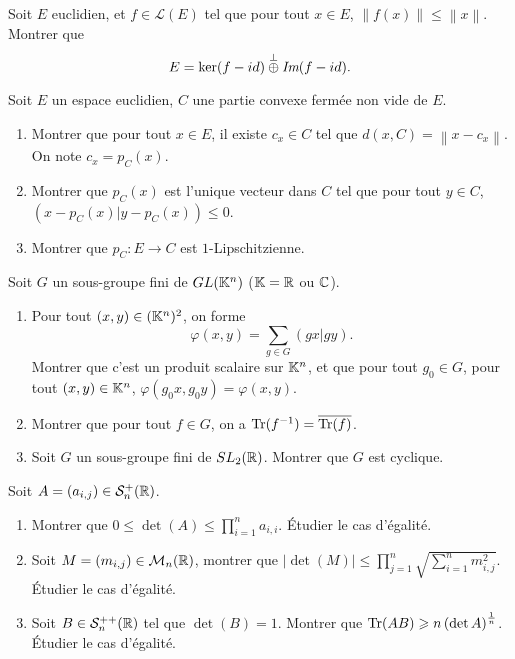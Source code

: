 \documentclass[12pt]{article}
\begin{document}
\begin{exercise}
	Soit $E$ euclidien, et $f\in\mathcal{L}(E)$ tel que pour tout $x\in E$, $\left\lVert f(x)\right\rVert\leqslant\left\lVert x\right\rVert$. Montrer que 
	\begin{equation}
		E=\ker(f-id)\overset{\perp}{\oplus}\emph{Im}(f-id).
	\end{equation}
\end{exercise}

\begin{exercise}
	Soit $E$ un espace euclidien, $C$ une partie convexe fermée non vide de $E$.
	\begin{enumerate}
		\item Montrer que pour tout $x\in E$, il existe $c_x\in C$ tel que $d(x,C)=\left\lVert x-c_x\right\rVert$. On note $c_x=p_{C}(x)$.
		\item Montrer que $p_{C}(x)$ est l'unique vecteur dans $C$ tel que pour tout $y\in C$, $(x-p_C(x)|y-p_C(x))\leqslant0$.
		\item Montrer que $p_C\colon E\to C$ est $1$-Lipschitzienne.
	\end{enumerate}
\end{exercise}

\begin{exercise}
	Soit $G$ un sous-groupe fini de $GL(\mathbb{K}^{n})$ ($\mathbb{K}=\mathbb{R}$ ou $\mathbb{C}$).
	\begin{enumerate}
		\item Pour tout $(x,y)\in(\mathbb{K}^{n})^{2}$, on forme 
		\begin{equation}
			\varphi(x,y)=\sum_{g\in G}(gx|gy).
		\end{equation}
		Montrer que c'est un produit scalaire sur $\mathbb{K}^{n}$, et que pour tout $g_0\in G$, pour tout $(x,y)\in \mathbb{K}^{n}$, $\varphi(g_0x,g_0y)=\varphi(x,y)$.
		\item Montrer que pour tout $f\in G$, on a $\operatorname{Tr}(f^{-1})=\overline{\operatorname{Tr}(f)}$.
		\item Soit $G$ un sous-groupe fini de $SL_{2}(\mathbb{R})$. Montrer que $G$ est cyclique.
	\end{enumerate}
\end{exercise}

\begin{exercise}
	Soit $A=(a_{i,j})\in \mathcal{S}_{n}^{+}(\mathbb{R})$.
	\begin{enumerate}
		\item Montrer que $0\leqslant\det(A)\leqslant\prod_{i=1}^{n}a_{i,i}$. Étudier le cas d'égalité.
		\item Soit $M=(m_{i,j})\in\mathcal{M}_{n}(\mathbb{R})$, montrer que $\left\lvert\det(M)\right\rvert\leqslant\prod_{j=1}^{n}\sqrt{\sum_{i=1}^{n}m_{i,j}^{2}}$. Étudier le cas d'égalité.
		\item Soit $B\in\mathcal{S}_{n}^{++}(\mathbb{R})$ tel que $\det(B)=1$. Montrer que $\operatorname{Tr}(AB)\geqslant n\left(\det A\right)^{\frac{1}{n}}$. Étudier le cas d'égalité.
	\end{enumerate}
\end{exercise}
\end{document}
